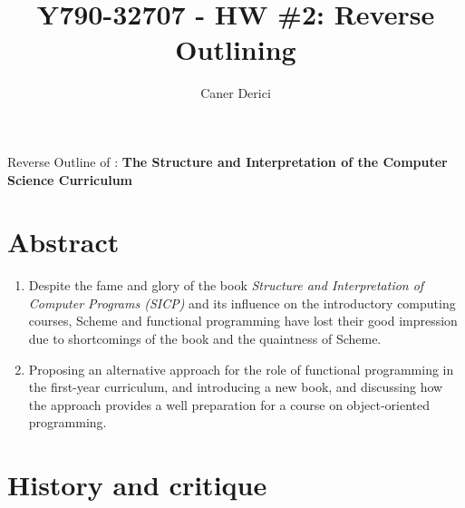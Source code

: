 \documentclass{article}
\title{Y790-32707 - HW \#2: Reverse Outlining}
\author{}
\date{Caner Derici}
\begin{document}

\maketitle



\begin{center}
  Reverse Outline of : \textbf{The Structure and Interpretation of the Computer Science Curriculum \cite{sicc2004}}
\end{center}

\section*{Abstract}

\begin{enumerate}
\item Despite the fame and glory of the book \textit{Structure and
  Interpretation of Computer Programs (SICP)} and its influence on the
  introductory computing courses, Scheme and functional programming
  have lost their good impression due to shortcomings of the book and
  the quaintness of Scheme.
\item Proposing an alternative approach for the role of functional
  programming in the first-year curriculum, and introducing a new
  book, and discussing how the approach provides a well preparation
  for a course on object-oriented programming.
\end{enumerate}

\section{History and critique}
\end{document}
